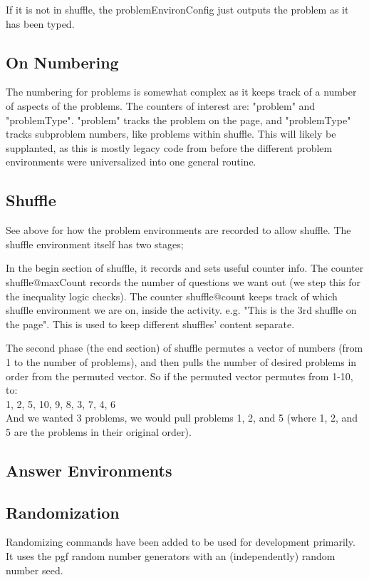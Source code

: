 \documentclass{ximera}
\begin{document}
		If it is not in shuffle, the problemEnvironConfig just outputs the problem as it has been typed.
		
	\subsection{On Numbering}
	The numbering for problems is somewhat complex as it keeps track of a number of aspects of the problems. The counters of interest are: "problem" and "problemType". "problem" tracks the problem on the page, and "problemType" tracks subproblem  numbers, like problems within shuffle. This will likely be supplanted, as this is mostly legacy code from before the different problem environments were universalized into one general routine. 
	
	\subsection{Shuffle}
	See above for how the problem environments are recorded to allow shuffle. 
	The shuffle environment itself has two stages;
	
	In the begin section of shuffle, it records and sets useful counter info. 
	The counter shuffle@maxCount records the number of questions we want out (we step this for the inequality logic checks).
	The counter shuffle@count keeps track of which shuffle environment we are on, inside the activity. e.g. "This is the 3rd shuffle on the page". This is used to keep different shuffles' content separate.
	
	The second phase (the end section) of shuffle permutes a vector of numbers (from 1 to the number of problems), and then pulls the number of desired problems in order from the permuted vector. So if the permuted vector permutes from 1-10, to:\\
	1, 2, 5, 10, 9, 8, 3, 7, 4, 6\\
	And we wanted 3 problems, we would pull problems 1, 2, and 5 (where 1, 2, and 5 are the problems in their original order).
	
	\subsection{Answer Environments}
	
	\subsection{Randomization}
	Randomizing commands have been added to be used for development primarily. It uses the pgf random number generators with an (independently) random number seed.
	
\end{document}
